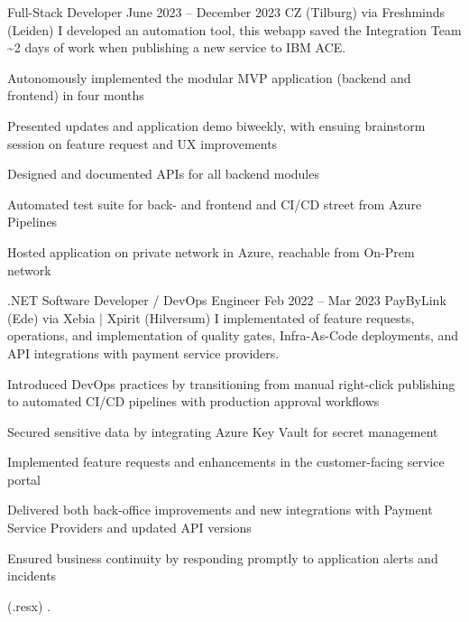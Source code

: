 \workentry
{Full-Stack Developer}
{June 2023 -- December 2023}
{CZ (Tilburg) via Freshminds (Leiden)}
{I developed an automation tool, this webapp saved the Integration Team \textasciitilde 2 days of work when publishing a new service to IBM ACE. \\
}
{
    \item Autonomously implemented the modular MVP application (backend and frontend) in four months
    \item Presented updates and application demo biweekly, with ensuing brainstorm session on feature request and UX improvements
    \item Designed and documented APIs for all backend modules
    \item Automated test suite for back- and frontend and CI/CD street from Azure Pipelines
    \item Hosted application on private network in Azure, reachable from On-Prem network
}
{
}

\workentry
{.NET Software Developer / DevOps Engineer}
{Feb 2022 -- Mar 2023}
{PayByLink (Ede) via Xebia | Xpirit (Hilversum)}
{I implementated of feature requests, operations, and implementation of quality gates, Infra-As-Code deployments, and API integrations with payment service providers.}
{
\item Introduced DevOps practices by transitioning from manual right-click publishing to automated CI/CD pipelines with production approval workflows

\item Secured sensitive data by integrating Azure Key Vault for secret management

\item Implemented feature requests and enhancements in the customer-facing service portal

\item Delivered both back-office improvements and new integrations with Payment Service Providers and updated API versions

\item Ensured business continuity by responding promptly to application alerts and incidents
}
{
 (.resx)
.
}

